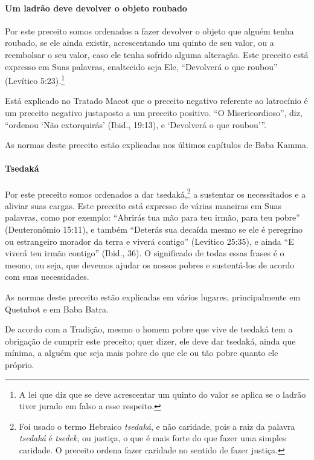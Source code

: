 \paragraph{Um ladrão deve devolver o objeto roubado}

Por este preceito somos ordenados a fazer devolver o objeto que alguém
tenha roubado, se ele ainda existir, acrescentando um quinto de seu
valor, ou a reembolsar o seu valor, caso ele tenha sofrido alguma
alteração. Este preceito está expresso em Suas palavras, enaltecido seja Ele,
``Devolverá o que roubou'' (Levítico 5:23).\footnote{A lei que diz que se deve acrescentar um quinto do valor se aplica se
  o ladrão tiver jurado em falso a esse respeito.}

Está explicado no Tratado Macot que o preceito negativo referente
ao latrocínio é um preceito negativo justaposto a um preceito positivo.
``O Misericordioso'', diz, ``ordenou `Não extorquirás' (Ibid., 19:13), e
`Devolverá o que roubou'''.

As normas deste preceito estão explicadas nos últimos capítulos de Baba Kamma.

\paragraph{Tsedaká}

Por este preceito somos ordenados a dar tsedaká,\footnote{Foi usado o termo Hebraico \emph{tsedaká}, e não caridade, pois a raiz da
  palavra \emph{tsedaká} é \emph{tsedek}, ou justiça, o que é mais forte do
  que fazer uma simples caridade. O preceito ordena fazer caridade no
  sentido de fazer justiça.} a sustentar
os necessitados e a aliviar suas cargas. Este preceito está expresso de
várias maneiras em Suas palavras, como por exemplo: ``Abrirás tua mão para teu
irmão, para teu pobre'' (Deuteronômio 15:11), e também ``Deterás sua decaída
mesmo se ele é peregrino ou estrangeiro morador da terra e viverá
contigo'' (Levítico 25:35), e ainda ``E viverá teu irmão contigo''
(Ibid., 36). O significado de todas essas frases é o mesmo, ou seja, que
devemos ajudar os nossos pobres e sustentá-los de acordo com suas
necessidades.

As normas deste preceito estão explicadas em vários lugares,
principalmente em Quetubot e em Baba Batra.

De acordo com a Tradição, mesmo o homem pobre que vive de tsedaká
tem a obrigação de cumprir este preceito; quer dizer, ele deve dar
tsedaká, ainda que mínima, a alguém que seja mais pobre do que ele
ou tão pobre quanto ele próprio.

